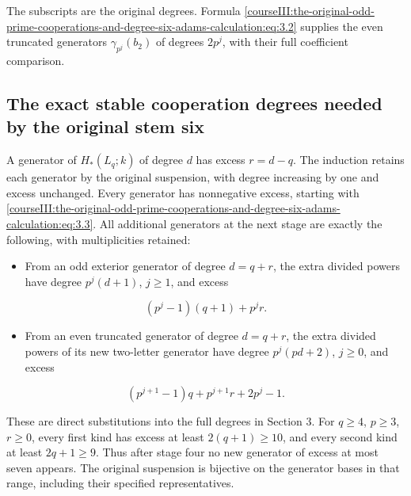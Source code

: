 The subscripts are the original degrees. Formula \eqref{courseIII:the-original-odd-prime-cooperations-and-degree-six-adams-calculation:eq:3.2} supplies the even truncated generators \(\gamma_{p^j}(b_2)\) of degrees \(2p^j\), with their full coefficient comparison.

\subsection{The exact stable cooperation degrees needed by the original stem six}
\label{courseIII:the-original-odd-prime-cooperations-and-degree-six-adams-calculation:odd-stable-cooperations}

\label{courseIII:the-original-odd-prime-cooperations-and-degree-six-adams-calculation:section-4}\label{courseIII:odd-coop:4}

A generator of \(H_*(L_q;k)\) of degree \(d\) has excess \(r=d-q\). The induction retains each generator by the original suspension, with degree increasing by one and excess unchanged. Every generator has nonnegative excess, starting with \eqref{courseIII:the-original-odd-prime-cooperations-and-degree-six-adams-calculation:eq:3.3}. All additional generators at the next stage are exactly the following, with multiplicities retained:

\begin{itemize}

\item
  From an odd exterior generator of degree \(d=q+r\), the extra divided powers have degree \(p^j(d+1)\), \(j\geq1\), and excess
\end{itemize}

\[(p^j-1)(q+1)+p^jr.\]

\begin{itemize}

\item
  From an even truncated generator of degree \(d=q+r\), the extra divided powers of its new two-letter generator have degree \(p^j(pd+2)\), \(j\geq0\), and excess
\end{itemize}

\[(p^{j+1}-1)q+p^{j+1}r+2p^j-1.\]

These are direct substitutions into the full degrees in Section 3. For \(q\geq4\), \(p\geq3\), \(r\geq0\), every first kind has excess at least \(2(q+1)\geq10\), and every second kind at least \(2q+1\geq9\). Thus after stage four no new generator of excess at most seven appears. The original suspension is bijective on the generator bases in that range, including their specified representatives.

